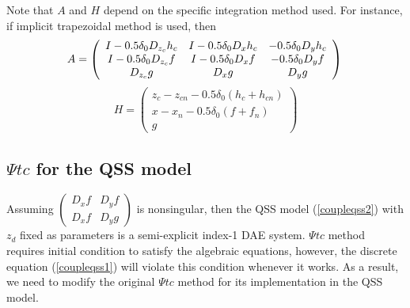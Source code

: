 \documentclass[journal]{IEEEtran}
\begin{document}
Note that $A$ and $H$ depend on the specific integration method used. For instance, if implicit trapezoidal method is used, then
\begin{equation}
A=\left(\begin{array}{ccc}I-0.5\delta_0D_{z_c} h_c&I-0.5\delta_0D_{x} h_c&-0.5\delta_0D_y h_c\\I-0.5\delta_0D_{z_c} f&I-0.5\delta_0D_x f &-0.5\delta_0D_y f\\D_{z_c} g&D_x g&D_y g\end{array}\right)\nonumber\\
\end{equation}
\begin{equation}
H=\left(\begin{array}{c}z_c-z_{cn}-0.5\delta_0(h_c+h_{cn})\\x-x_{n}-0.5\delta_0(f+f_{n})\\g\end{array}\right)\nonumber
\end{equation}

\subsection{$\Psi tc$ for the QSS model}
Assuming $\left(\begin{array}{cc}D_x f&D_y f\\D_x f&D_y g\end{array}\right)$ is nonsingular, then the QSS model (\ref{coupleqss2}) with $z_d$ fixed as parameters is a semi-explicit index-1 DAE system. $\Psi tc$ method requires initial condition to satisfy the algebraic equations, however, the discrete equation (\ref{coupleqss1}) will violate this condition whenever it works. As a result, we need to modify the original $\Psi tc$ method for its implementation in the QSS model.
\end{document}
